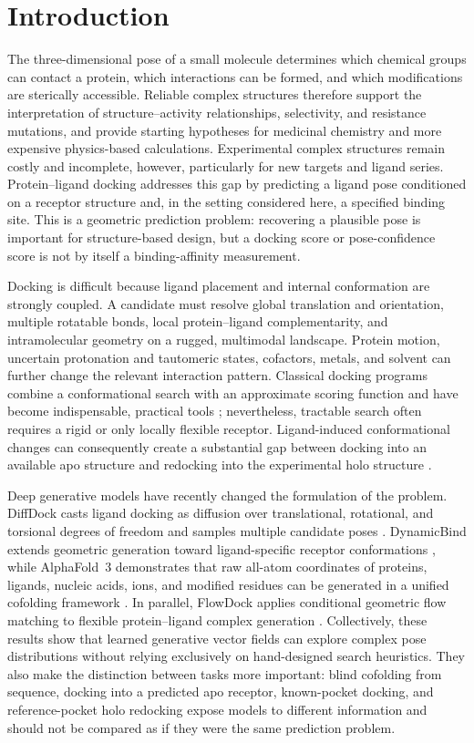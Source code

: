 \section{Introduction}
\label{sec:introduction}

The three-dimensional pose of a small molecule determines which chemical
groups can contact a protein, which interactions can be formed, and which
modifications are sterically accessible. Reliable complex structures therefore
support the interpretation of structure--activity relationships, selectivity,
and resistance mutations, and provide starting hypotheses for medicinal
chemistry and more expensive physics-based calculations. Experimental complex
structures remain costly and incomplete, however, particularly for new targets
and ligand series. Protein--ligand docking addresses this gap by predicting a
ligand pose conditioned on a receptor structure and, in the setting considered
here, a specified binding site. This is a geometric prediction problem:
recovering a plausible pose is important for structure-based design, but a
docking score or pose-confidence score is not by itself a binding-affinity
measurement.

Docking is difficult because ligand placement and internal conformation are
strongly coupled. A candidate must resolve global translation and orientation,
multiple rotatable bonds, local protein--ligand complementarity, and
intramolecular geometry on a rugged, multimodal landscape. Protein motion,
uncertain protonation and tautomeric states, cofactors, metals, and solvent can
further change the relevant interaction pattern. Classical docking programs
combine a conformational search with an approximate scoring function and have
become indispensable, practical tools \citep{trott2010vina}; nevertheless,
tractable search often requires a rigid or only locally flexible receptor.
Ligand-induced conformational changes can consequently create a substantial
gap between docking into an available apo structure and redocking into the
experimental holo structure \citep{lu2024dynamicbind}.

Deep generative models have recently changed the formulation of the problem.
DiffDock casts ligand docking as diffusion over translational, rotational, and
torsional degrees of freedom and samples multiple candidate poses
\citep{corso2023diffdock}. DynamicBind extends geometric generation toward
ligand-specific receptor conformations \citep{lu2024dynamicbind}, while
AlphaFold~3 demonstrates that raw all-atom coordinates of proteins, ligands,
nucleic acids, ions, and modified residues can be generated in a unified
cofolding framework \citep{abramson2024alphafold3}. In parallel, FlowDock
applies conditional geometric flow matching to flexible protein--ligand
complex generation \citep{morehead2025flowdock}. Collectively, these results
show that learned generative vector fields can explore complex pose
distributions without relying exclusively on hand-designed search heuristics.
They also make the distinction between tasks more important: blind cofolding
from sequence, docking into a predicted apo receptor, known-pocket docking,
and reference-pocket holo redocking expose models to different information and
should not be compared as if they were the same prediction problem.

